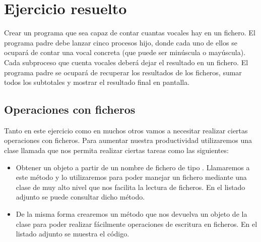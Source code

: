 \documentclass[letterpaper,10pt,spanish]{sphinxmanual}
\begin{document}
\section{Ejercicio resuelto}
\label{\detokenize{textos/tema1:ejercicio-resuelto}}
Crear un programa que sea capaz de contar cuantas vocales hay en un fichero. El programa padre debe lanzar cinco procesos hijo, donde cada uno de ellos se ocupará de contar una vocal concreta (que puede ser minúscula o mayúscula). Cada subproceso que cuenta vocales deberá dejar el resultado en un fichero. El programa padre se ocupará de recuperar los resultados de los ficheros, sumar todos los subtotales y mostrar el resultado final en pantalla.


\subsection{Operaciones con ficheros}
\label{\detokenize{textos/tema1:operaciones-con-ficheros}}
Tanto en este ejercicio como en muchos otros vamos a necesitar realizar ciertas operaciones con ficheros. Para aumentar nuestra productividad utilizaremos una clase llamada  que nos permita realizar ciertas tareas como las siguientes:
\begin{itemize}
\item {} 
Obtener un objeto  a partir de un nombre de fichero de tipo . Llamaremos a este método  y lo utilizaremos para poder manejar un fichero mediante una clase de muy alto nivel que nos facilita la lectura de ficheros. En el listado adjunto se puede consultar dicho método.

\end{itemize}

%
\begin{sphinxVerbatim}[commandchars=\\\{\}]
   
      
 
     
       
     
       
     
\end{sphinxVerbatim}
\begin{itemize}
\item {} 
De la misma forma crearemos un método  que nos devuelva un objeto de la clase  para poder realizar fácilmente operaciones de escritura en ficheros. En el listado adjunto se muestra el código.

\end{itemize}
\end{document}
